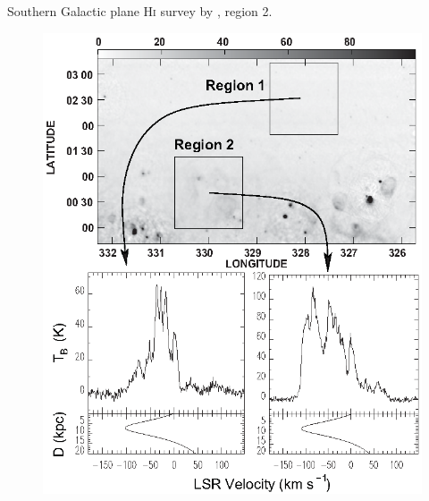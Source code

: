 \documentclass[12pt]{article}
\begin{document}
        \clearpage
        \begin{small}
        Southern Galactic plane H\textsc{i} survey by \cite{2001ApJ...561..264D}, region 2.
        \end{small}
            \begin{figure}[hb]
              \centering
              \includegraphics[totalheight=80 mm]{img/Dickey2001_regions.eps}

\end{figure}
\end{document}
